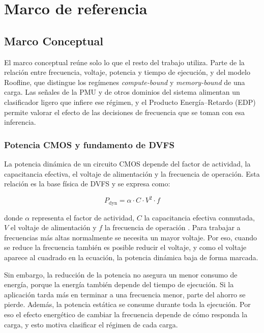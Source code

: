 \chapter{Marco de referencia}
\label{cap:marco}

\section{Marco Conceptual}
\label{sec:marco-conceptual}

El marco conceptual reúne solo lo que el resto del trabajo utiliza. Parte de la relación entre frecuencia, voltaje, potencia y tiempo de ejecución, y del modelo Roofline, que distingue los regímenes \textit{compute-bound} y \textit{memory-bound} de una carga. Las señales de la PMU y de otros dominios del sistema alimentan un clasificador ligero que infiere ese régimen, y el Producto Energía--Retardo (EDP) permite valorar el efecto de las decisiones de frecuencia que se toman con esa inferencia.

\subsection{Potencia CMOS y fundamento de DVFS}

\label{sec:marco-cmos}

La potencia dinámica de un circuito CMOS depende del factor de actividad, la capacitancia efectiva, el voltaje de alimentación y la frecuencia de operación. Esta relación es la base física de DVFS y se expresa como:

\begin{equation}
P_{\text{dyn}} = \alpha \cdot C \cdot V^{2} \cdot f
\end{equation}

donde $\alpha$ representa el factor de actividad, $C$ la capacitancia efectiva conmutada, $V$ el voltaje de alimentación y $f$ la frecuencia de operación \cite{Gonzalez1997}. Para trabajar a frecuencias más altas normalmente se necesita un mayor voltaje. Por eso, cuando se reduce la frecuencia también es posible reducir el voltaje, y como el voltaje aparece al cuadrado en la ecuación, la potencia dinámica baja de forma marcada.

Sin embargo, la reducción de la potencia no asegura un menor consumo de energía, porque la energía también depende del tiempo de ejecución. Si la aplicación tarda más en terminar a una frecuencia menor, parte del ahorro se pierde. Además, la potencia estática se consume durante toda la ejecución. Por eso el efecto energético de cambiar la frecuencia depende de cómo responda la carga, y esto motiva clasificar el régimen de cada carga.

